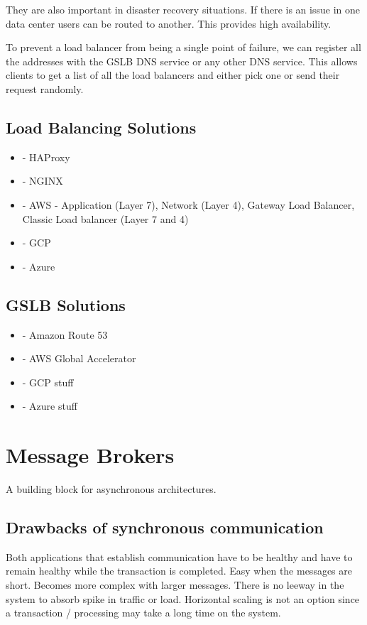 They are also important in disaster recovery situations.
If there is an issue in one data center users can be routed to another.
This provides high availability.

To prevent a load balancer from being a single point of failure, we can register all the addresses with the GSLB DNS service or any other DNS service.
This allows clients to get a list of all the load balancers and either pick one or send their request randomly.

\subsection{Load Balancing Solutions}
\begin{itemize}
    \item - HAProxy
    \item - NGINX
    \item - AWS - Application (Layer 7), Network (Layer 4), Gateway Load Balancer, Classic Load balancer (Layer 7 and 4)
    \item - GCP %
    \item - Azure %
\end{itemize}

\subsection{GSLB Solutions}
\begin{itemize}
    \item - Amazon Route 53
    \item - AWS Global Accelerator
    \item - GCP stuff
    \item - Azure stuff
\end{itemize}

\section{Message Brokers}
A building block for asynchronous architectures.

\subsection{Drawbacks of synchronous communication}

Both applications that establish communication have to be healthy and have to remain healthy while the transaction is completed.
Easy when the messages are short.
Becomes more complex with larger messages.
There is no leeway in the system to absorb spike in traffic or load.
Horizontal scaling is not an option since a transaction / processing may take a long time on the system.

